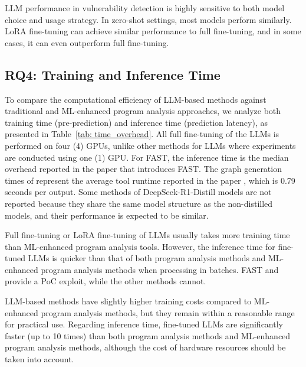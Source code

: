 \documentclass[12pt,openany,oneside,table]{cmuthesis}
\begin{document}
\begin{tcolorbox}[colback=white,colframe=black,arc=0pt,boxrule=0.5pt,title=RQ3 Summary,boxsep=2pt,left=1pt,right=1pt,top=1pt,bottom=1pt,fonttitle=\bfseries]
LLM performance in vulnerability detection is highly sensitive to both model choice and usage strategy. In zero-shot settings, most models perform similarly.
LoRA fine-tuning can achieve similar performance to full fine-tuning, and in some cases, it can even outperform full fine-tuning.
\end{tcolorbox}


\subsection{RQ4: Training and Inference Time}


To compare the computational efficiency of LLM-based methods against traditional and ML-enhanced program analysis approaches, we analyze both training time (pre-prediction) and inference time (prediction latency), as presented in Table~\ref{tab: time_overhead}.
All full fine-tuning of the LLMs is performed on four (4) GPUs, unlike other methods for LLMs where experiments are conducted using one (1) GPU. For FAST, the inference time is the median overhead reported in the paper \cite{kang2023scaling} that introduces FAST. The graph generation times of \nodemedicfine represent the average tool runtime reported in the paper \cite{cassel2023nodemedic}, which is 0.79 seconds per output. Some methods of DeepSeek-R1-Distill models are not reported because they share the same model structure as the non-distilled models, and their performance is expected to be similar.

Full fine-tuning or LoRA fine-tuning of LLMs usually takes more training time than ML-enhanced program analysis tools. However, the inference time for fine-tuned LLMs is quicker than that of both program analysis methods and ML-enhanced program analysis methods when processing in batches.
FAST and \nodemedicfine{} provide a PoC exploit, while the other methods cannot.




\begin{tcolorbox}[colback=white,colframe=black,arc=0pt,boxrule=0.5pt,title=RQ4 Summary,boxsep=2pt,left=1pt,right=1pt,top=1pt,bottom=1pt,fonttitle=\bfseries]
LLM-based methods have slightly higher training costs compared to ML-enhanced program analysis methods, but they remain within a reasonable range for practical use. Regarding inference time, fine-tuned LLMs are significantly faster (up to 10 times) than both program analysis methods and ML-enhanced program analysis methods, although the cost of hardware resources should be taken into account.
\end{tcolorbox}
\end{document}

